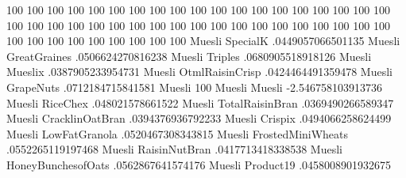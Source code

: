 100%
100%
100%
100%
100%
100%
100%
100%
100%
100%
100%
100%
100%
100%
100%
100%
100%
100%
100%
100%
100%
100%
100%
100%
100%
100%
100%
100%
100%
100%
100%
100%
100%
100%
100%
100%
100%
100%
100%
100%
100%
100%
100%
100%
100%
100%
100%
Muesli	SpecialK	.0449057066501135
Muesli	GreatGraines	.0506624270816238
Muesli	Triples	.0680905518918126
Muesli	Mueslix	.0387905233954731
Muesli	OtmlRaisinCrisp	.0424464491359478
Muesli	GrapeNuts	.0712184715841581
Muesli	100%
Muesli	Muesli	-2.546758103913736
Muesli	RiceChex	.048021578661522
Muesli	TotalRaisinBran	.0369490266589347
Muesli	CracklinOatBran	.0394376936792233
Muesli	Crispix	.0494066258624499
Muesli	LowFatGranola	.0520467308343815
Muesli	FrostedMiniWheats	.0552265119197468
Muesli	RaisinNutBran	.0417713418338538
Muesli	HoneyBunchesofOats	.0562867641574176
Muesli	Product19	.0458008901932675
